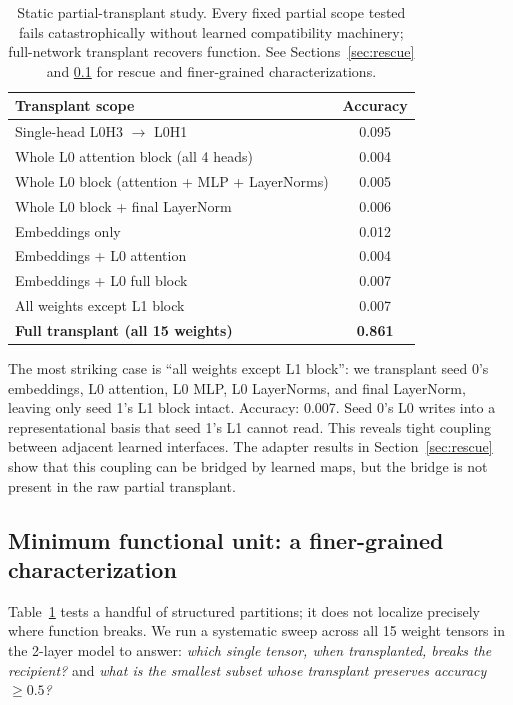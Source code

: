 \documentclass[final]{article}
\begin{document}
\begin{table}[h]
\centering
\caption{Static partial-transplant study. Every fixed partial scope tested
fails catastrophically without learned compatibility machinery; full-network
transplant recovers function. See Sections~\ref{sec:rescue} and
\ref{sec:minunit} for rescue and finer-grained characterizations.}
\label{tab:wholenet}
\begin{tabular}{lc}
\toprule
Transplant scope & Accuracy \\
\midrule
Single-head L0H3 $\to$ L0H1                          & 0.095 \\
Whole L0 attention block (all 4 heads)               & 0.004 \\
Whole L0 block (attention + MLP + LayerNorms)        & 0.005 \\
Whole L0 block + final LayerNorm                     & 0.006 \\
Embeddings only                                       & 0.012 \\
Embeddings + L0 attention                            & 0.004 \\
Embeddings + L0 full block                           & 0.007 \\
All weights except L1 block                          & 0.007 \\
\textbf{Full transplant (all 15 weights)}            & \textbf{0.861} \\
\bottomrule
\end{tabular}
\end{table}

The most striking case is ``all weights except L1 block'': we transplant seed
0's embeddings, L0 attention, L0 MLP, L0 LayerNorms, and final LayerNorm,
leaving only seed 1's L1 block intact. Accuracy: 0.007. Seed 0's L0 writes
into a representational basis that seed 1's L1 cannot read. This reveals tight
coupling between adjacent learned interfaces. The adapter results in
Section~\ref{sec:rescue} show that this coupling can be bridged by learned
maps, but the bridge is not present in the raw partial transplant.

\subsection{Minimum functional unit: a finer-grained characterization}
\label{sec:minunit}

Table~\ref{tab:wholenet} tests a handful of structured partitions; it does not
localize precisely where function breaks. We run a systematic sweep across all
15 weight tensors in the 2-layer model to answer: \emph{which single tensor,
when transplanted, breaks the recipient?} and \emph{what is the smallest
subset whose transplant preserves accuracy $\geq 0.5$?}
\end{document}
